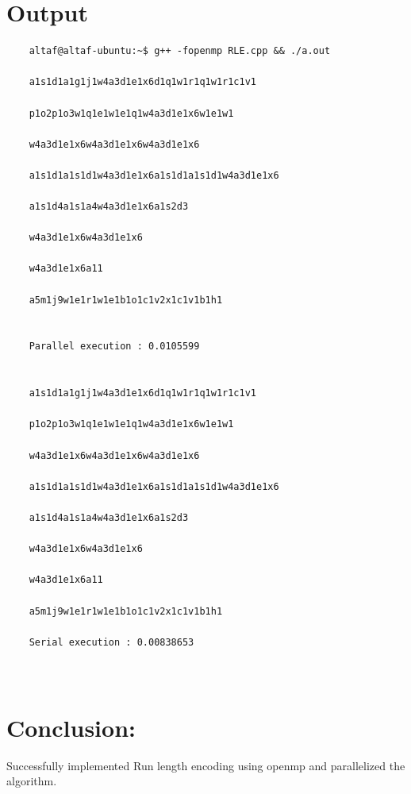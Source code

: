 \documentclass[15pt,a4paper]{article}
\begin{document}
	\section{Output}
	\begin{verbatim}
	altaf@altaf-ubuntu:~$ g++ -fopenmp RLE.cpp && ./a.out
	
	a1s1d1a1g1j1w4a3d1e1x6d1q1w1r1q1w1r1c1v1
	
	p1o2p1o3w1q1e1w1e1q1w4a3d1e1x6w1e1w1
	
	w4a3d1e1x6w4a3d1e1x6w4a3d1e1x6
	
	a1s1d1a1s1d1w4a3d1e1x6a1s1d1a1s1d1w4a3d1e1x6
	
	a1s1d4a1s1a4w4a3d1e1x6a1s2d3
	
	w4a3d1e1x6w4a3d1e1x6
	
	w4a3d1e1x6a11
	
	a5m1j9w1e1r1w1e1b1o1c1v2x1c1v1b1h1
	

	Parallel execution : 0.0105599
	
	
	a1s1d1a1g1j1w4a3d1e1x6d1q1w1r1q1w1r1c1v1
	
	p1o2p1o3w1q1e1w1e1q1w4a3d1e1x6w1e1w1
	
	w4a3d1e1x6w4a3d1e1x6w4a3d1e1x6
	
	a1s1d1a1s1d1w4a3d1e1x6a1s1d1a1s1d1w4a3d1e1x6
	
	a1s1d4a1s1a4w4a3d1e1x6a1s2d3
	
	w4a3d1e1x6w4a3d1e1x6
	
	w4a3d1e1x6a11
	
	a5m1j9w1e1r1w1e1b1o1c1v2x1c1v1b1h1
	
	Serial execution : 0.00838653
	
	
	\end{verbatim}
		
	\section{Conclusion:}
     Successfully implemented Run length encoding using openmp and parallelized the algorithm.
\end{document}
